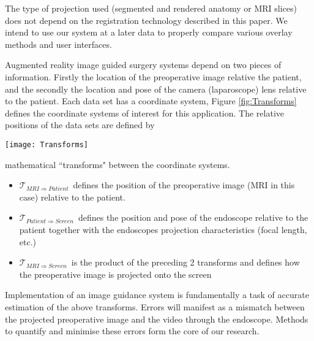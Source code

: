 \documentclass[3p,twocolumn,preprint,10pt]{elsarticle}
\newcommand{\Tpreop}{$\mathcal{T}_{MRI \Rightarrow Patient}$}
\newcommand{\Tlens}{$\mathcal{T}_{Patient \Rightarrow Screen}$}
\newcommand{\Tsystem}{$\mathcal{T}_{MRI \Rightarrow Screen}$}
\begin{document}
The type of projection used (segmented and rendered anatomy or MRI slices) does
not depend on the registration technology described in this paper. We intend to use our system
at a later data to properly compare various overlay methods and user interfaces.

Augmented reality image guided surgery systems depend on two pieces of information.
Firstly the location of the preoperative image relative the patient, and the secondly the location and
pose of the camera (laparoscope) lens relative to the patient. Each data set has a coordinate system,
Figure
\ref{fig:Transforms} defines the coordinate systems of interest for this
application. The relative positions of the data sets are defined by 
\begin{figure*}
\begin{center}
\texttt{[image: Transforms]}
\end{center}
\caption{\label{fig:Transforms}Any image guided surgery system is defined by a 
set of geometric transforms between different coordinate systems. The figure above 
defines the coordinate systems relevant here. The transforms between individual 
coordinate systems are combined to give the transform between the preoperative MRI
($CS_{MRI}$) and the endoscope's video screen ($CS_{Screen}$). 
}
\end{figure*}
mathematical ``transforms" between the coordinate systems.
\begin{itemize}
\item{\Tpreop \ defines the position of the preoperative image (MRI in this case) 
relative to the patient.}
\item{\Tlens \ defines the position and pose of the endoscope relative to the patient 
together with the endoscopes projection characteristics (focal length, etc.)}
\item{\Tsystem \ is the product of the preceding 2 transforms and defines how 
the preoperative image is projected onto the screen}
\end{itemize}

Implementation of an image guidance system is fundamentally a task of accurate estimation of the 
above transforms. 
Errors will manifest as a mismatch between the projected preoperative 
image and the video through the endoscope.  
Methods to quantify and minimise these errors form the core of our research.
\end{document}
